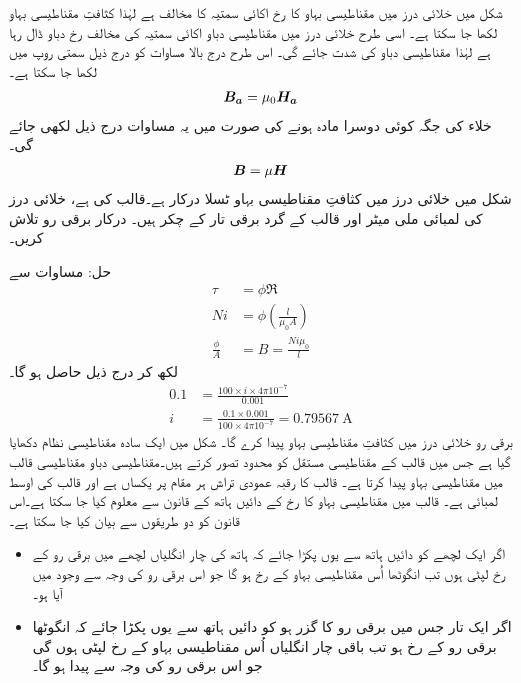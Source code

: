شکل  میں خلائی درز میں مقناطیسی بہاو کا رخ  اکائی سمتیہ   کا مخالف ہے لہٰذا کثافتِ مقناطیسی بہاو  لکھا جا سکتا ہے۔ اسی طرح خلائی درز میں مقناطیسی دباو  اکائی سمتیہ  کی مخالف رخ دباو ڈال رہا ہے لہٰذا مقناطیسی دباو کی شدت  جائے گی۔ اس طرح درج بالا مساوات کو درج ذیل سمتی روپ میں  لکھا جا سکتا ہے۔
\begin{align}
{\ensuremath{{\boldsymbol{B_a}}}}=\mu_0 {{\boldsymbol{H_a}}}
\end{align}
خلاء کی جگہ کوئی دوسرا مادہ ہونے کی صورت میں یہ مساوات  درج ذیل لکھی جائے گی۔
\begin{align}
{\ensuremath{{\boldsymbol{B}}}}=\mu {\ensuremath{{\boldsymbol{H}}}}
\end{align}
%
شکل  میں خلائی درز میں کثافتِ مقناطیسی بہاو  ٹسلا درکار ہے۔قالب کی   ہے، خلائی درز کی لمبائی  ملی میٹر اور  قالب کے گرد برقی تار کے چکر   ہیں۔ درکار برقی رو  تلاش کریں۔

حل:\quad
مساوات  سے 
\begin{align*}
\tau&=\phi \Re\\
N i &= \phi \left(\frac{l}{\mu_0 A} \right)\\
\frac{\phi}{A}&=B=\frac{ N i \mu_0}{l}
\end{align*}
لکھ کر درج ذیل حاصل ہو گا۔
\begin{align*}
0.1&=\frac{100 \times i \times 4 \pi  10^{-7}}{0.001}\\
i&=\frac{0.1 \times 0.001}{100 \times 4 \pi  10^{-7}}=\SI{0.79567}{\ampere}
\end{align*}
 برقی رو  خلائی درز میں  کثافتِ مقناطیسی بہاو پیدا کرے گا۔
%
شکل  میں ایک سادہ مقناطیسی نظام دکھایا گیا ہے جس میں قالب کے مقناطیسی مستقل کو محدود تصور کرتے ہیں۔مقناطیسی دباو   مقناطیسی قالب میں مقناطیسی بہاو  پیدا کرتا ہے۔ قالب کا رقبہ عمودی تراش   ہر مقام پر  یکساں ہے اور قالب  کی اوسط لمبائی  ہے۔ قالب میں مقناطیسی بہاو  کا رخ   کے دائیں ہاتھ کے قانون  سے معلوم کیا جا سکتا ہے۔اس قانون کو دو طریقوں سے بیان کیا جا سکتا ہے۔
\begin{itemize}
\item
اگر ایک لچھے کو دائیں ہاتھ سے یوں پکڑا  جائے کہ ہاتھ کی چار انگلیاں لچھے میں برقی رو کے رخ لپٹی  ہوں تب انگوٹھا اُس مقناطیسی بہاو کے رخ ہو گا جو اس برقی رو کی وجہ سے وجود میں آیا ہو۔
\item
اگر ایک تار جس میں برقی رو کا گزر ہو کو دائیں ہاتھ سے یوں پکڑا جائے کہ انگوٹھا  برقی رو  کے رخ ہو تب باقی چار انگلیاں اُس مقناطیسی  بہاو کے رخ لپٹی ہوں گی  جو اس برقی رو کی وجہ سے  پیدا ہو گا۔
\end{itemize}

